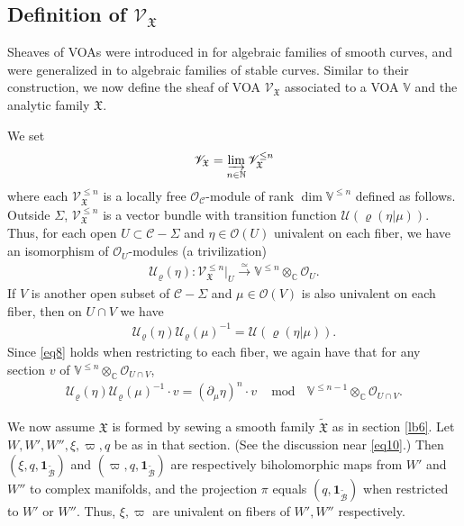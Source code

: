 \documentclass[12pt,a4paper,notitlepage]{article}
\theoremstyle{definition}
\theoremstyle{plain}
\newcommand{\fk}{\mathfrak}
\newcommand{\mc}{\mathcal}
\newcommand{\wtd}{\widetilde}
\newcommand{\id}{\mathbf{1}}
\newcommand{\scr}{\mathscr}
\newcommand{\Vbb}{\mathbb V}
\newcommand{\Cbb}{\mathbb C}
\newcommand{\Nbb}{\mathbb N}
\numberwithin{equation}{section}
\begin{document}
\subsection*{Definition of $\scr V_{\fk X}$}

Sheaves of VOAs were introduced in \cite{FB04} for algebraic families of smooth curves, and were generalized in \cite{DGT19a} to algebraic families of stable curves. Similar to their construction, we now define the sheaf of VOA $\scr V_{\fk X}$ associated to a VOA $\Vbb$ and the analytic family $\fk X$. 

We  \index{VX@$\scr V_{\fk X},\scr V_{\fk X}^{\leq n}$} set
\begin{align*}
\scr V_{\fk X}=\varinjlim_{n\in\Nbb}\scr V_{\fk X}^{\leq n}
\end{align*}
where each $\scr V_{\fk X}^{\leq n}$ is a locally free $\scr O_{\mc C}$-module of rank $\dim\Vbb^{\leq n}$ defined as follows. Outside $\Sigma$, $\scr V_{\fk X}^{\leq n}$ is a vector bundle with transition function $\mc U(\varrho(\eta|\mu))$. Thus, for each open $U\subset\mc C-\Sigma$ and $\eta\in\scr O(U)$ univalent on each fiber, we have an isomorphism of $\scr O_U$-modules \index{U@$\mc U_\varrho(\eta)$} (a trivilization) 
\begin{align}
\mc U_\varrho(\eta):\scr V_{\fk X}^{\leq n}|_U\xrightarrow{\simeq} \Vbb^{\leq n}\otimes_{\Cbb}\scr O_U.\label{eq35}
\end{align}
If $V$ is another open subset of $\mc C-\Sigma$ and $\mu\in\scr O(V)$ is also univalent on each fiber, then on $U\cap V$ we have
\begin{align}
\mc U_\varrho(\eta)\mc U_\varrho(\mu)^{-1}=\mc U(\varrho(\eta|\mu)).
\end{align}
Since \eqref{eq8} holds when restricting to each fiber, we again have that for any section $v$ of $\Vbb^{\leq n}\otimes_{\Cbb}\scr O_{U\cap V}$,
\begin{align}
\mc U_\varrho(\eta)\mc U_\varrho(\mu)^{-1}\cdot v=(\partial_\mu\eta)^n\cdot v~~\mod ~~\Vbb^{\leq n-1}\otimes_{\Cbb}\scr O_{U\cap V}.\label{eq25}
\end{align}


We now assume $\fk X$ is formed by sewing a smooth family $\wtd{\fk X}$ as in section \ref{lb6}. Let $W,W',W'',\xi,\varpi,q$ be as in that section. (See the discussion near \eqref{eq10}.) Then $(\xi,q,\id_{\wtd {\mc B}})$ and $(\varpi,q,\id_{\wtd{\mc B}})$ are respectively biholomorphic maps from $W'$ and $W''$ to complex manifolds, and the projection $\pi$ equals $(q,\id_{\wtd{\mc B}})$ when restricted to $W'$ or $W''$. Thus, $\xi,\varpi$ are univalent on fibers of $W',W''$ respectively.
\end{document}
